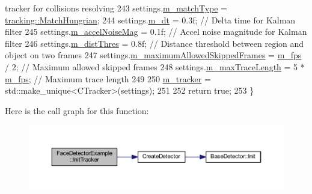 \begin{DoxyCode}
{       tracker for collisions resolving}
243         settings.\mbox{\hyperlink{struct_tracker_settings_a94a05cbda5eeeac7fa1b64baf9c703f5}{m\_matchType}} = \mbox{\hyperlink{namespacetracking_a491e50c9261ab820965d871a217d4f13a8c97315e46df8c0716a9538655fc967d}{tracking::MatchHungrian}};
244         settings.\mbox{\hyperlink{struct_tracker_settings_ae876ad4f3599a782cddb37e318430aaa}{m\_dt}} = 0.3f;                             \textcolor{comment}{// Delta time for Kalman filter}
245         settings.\mbox{\hyperlink{struct_tracker_settings_a9d4bcf1b68d5a13de8f9fea89f3b694f}{m\_accelNoiseMag}} = 0.1f;                  \textcolor{comment}{// Accel noise magnitude for
       Kalman filter}
246         settings.\mbox{\hyperlink{struct_tracker_settings_a10e76ae03bd840f6c9180ce67faaa83c}{m\_distThres}} = 0.8f;           \textcolor{comment}{// Distance threshold between region and object
       on two frames}
247         settings.\mbox{\hyperlink{struct_tracker_settings_a7825c3e88ee979fba2844c238fc51139}{m\_maximumAllowedSkippedFrames}} = 
      \mbox{\hyperlink{class_video_example_ae8110012f8d57f39d6355377cf20fb27}{m\_fps}} / 2;   \textcolor{comment}{// Maximum allowed skipped frames}
248         settings.\mbox{\hyperlink{struct_tracker_settings_abc7ce62dfe8de5ae33506aac41fddcac}{m\_maxTraceLength}} = 5 * \mbox{\hyperlink{class_video_example_ae8110012f8d57f39d6355377cf20fb27}{m\_fps}};            \textcolor{comment}{// Maximum trace length}
249 
250         \mbox{\hyperlink{class_video_example_a7c58cd8c883981b2e645d1a3d8edf76a}{m\_tracker}} = std::make\_unique<CTracker>(settings);
251 
252         \textcolor{keywordflow}{return} \textcolor{keyword}{true};
253     \}
\end{DoxyCode}
Here is the call graph for this function\+:\nopagebreak
\begin{figure}[H]
\begin{center}
\leavevmode
\includegraphics[width=350pt]{class_face_detector_example_a605d06dff8405d78a99ef3c383e88ad5_cgraph}
\end{center}
\end{figure}
\mbox{\label{class_video_example_a87efc66a82c36ad3380623d30a12abf2}} 
